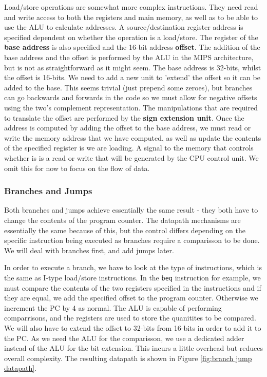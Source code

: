 \documentclass{article}
\begin{document}
	\par 
	Load/store operations are somewhat more complex instructions. They need read and write access to both the registers and main memory, as well as to be able to use the ALU to calculate addresses. A source/destination register address is specified dependent on whether the operation is a load/store. The register of the \textbf{base address} is also specified and the 16-bit address \textbf{offset}. The addition of the base address and the offset is performed by the ALU in the MIPS architecture, but is not as straightforward as it might seem. The base address is 32-bits, whilst the offset is 16-bits. We need to add a new unit to 'extend' the offset so it can be added to the base. This seems trivial (just prepend some zeroes), but branches can go backwards and forwards in the code so we must allow for negative offsets using the two's complement representation. The manipulations that are required to translate the offset are performed by the \textbf{sign extension unit}. Once the address is computed by adding the offset to the base address, we must read or write the memory address that we have computed, as well as update the contents of the specified register is we are loading. A signal to the memory that controls whether is is a read or write that will be generated by the CPU control unit. We omit this for now to focus on the flow of data.
	
	\subsubsection{Branches and Jumps}
	Both branches and jumps achieve essentially the same result - they both have to change the contents of the program counter. The datapath mechanisms are essentially the same because of this, but the control differs depending on the specific instruction being executed as branches require a comparisson to be done. We will deal with branches first, and add jumps later.
	
	\par 
	In order to execute a branch, we have to look at the type of instructions, which is the same as I-type load/store instructions. In the \texttt{beq} instruction for example, we must compare the contents of the two registers specified in the instructions and if they are equal, we add the specified offset to the program counter. Otherwise we increment the PC by 4 as normal. The ALU is capable of performing comparrisons, and the registers are used to store the quanitites to be compared. We will also have to extend the offset to 32-bits from 16-bits in order to add it to the PC. As we need the ALU for the comparisson, we use a dedicated adder instead of the ALU for the bit extension. This incurs a little overhead but reduces overall complexity. The resulting datapath is shown in Figure \ref{fig:branch jump datapath}.
	
\end{document}
